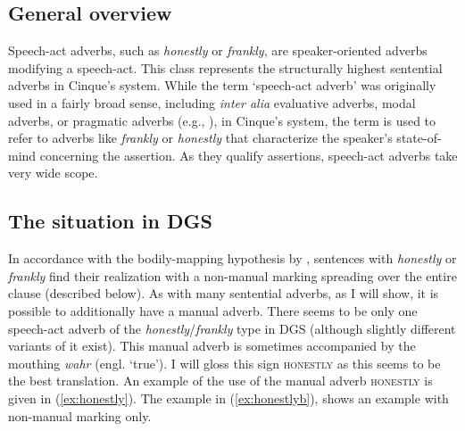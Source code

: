 \subsection{General overview}
Speech-act adverbs, such as \textit{honestly} or \textit{frankly}, are speaker-oriented adverbs modifying a speech-act. This class represents the structurally highest sentential adverbs in Cinque's system. While the term `speech-act adverb' was originally used in a fairly broad sense, including \textit{inter alia} evaluative adverbs, modal
adverbs, or pragmatic adverbs (e.g., \citealt{jackendoff1972semantic, bellert1977semantic}), in Cinque's system, the term is used to refer to adverbs like \textit{frankly} or \textit{honestly} that characterize the speaker's state-of-mind concerning the assertion. As they qualify assertions, speech-act adverbs take very wide scope.

\subsection{The situation in DGS}
In accordance with the bodily-mapping hypothesis by \citet{bross2017scope}, sentences with \textit{honestly} or \textit{frankly} find their realization with a non-manual marking spreading over the entire clause (described below). As with many sentential adverbs, as I will show, it is possible to additionally have a manual adverb. There seems to be only one speech-act adverb of the \textit{honestly}/\textit{frankly} type in DGS (although slightly different variants of it exist). This manual adverb is sometimes accompanied by the mouthing \textit{wahr} (engl. `true'). I will gloss this sign \textsc{honestly} as this seems to be the best translation. An example of the use of the manual adverb \textsc{honestly} is given in (\ref{ex:honestly}). The example in (\ref{ex:honestlyb}), shows an example with non-manual marking only.

